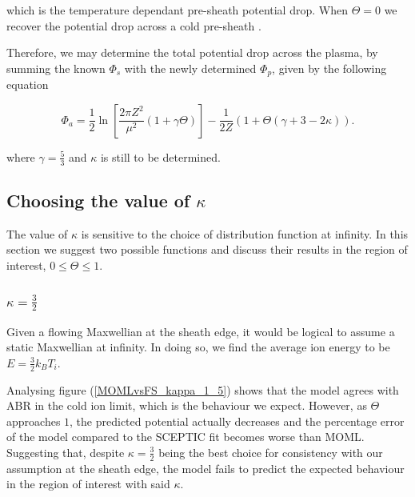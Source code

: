 \documentclass{article}
\begin{document}
\noindent which is the temperature dependant pre-sheath potential drop.
When $\Theta = 0$ we recover the potential drop across a cold pre-sheath \cite{Stangeby1986}.

\smallskip

Therefore, we may determine the total potential drop across the plasma, by summing the known
$\Phi_s$ with the newly determined $\Phi_p$, given by the following equation

\begin{equation}\label{eq:FSpotential}
\Phi_a =  \frac{1}{2}\ln{\left[\frac{2\pi Z^2}{\mu^2}(1 + \gamma \Theta)\right]} - \frac{1}{2Z}\left(1 + \Theta\left(\gamma + 3 -2\kappa\right)\right).
\end{equation}

\smallskip

\noindent where $\gamma = \frac{5}{3}$ and $\kappa$ is still to be determined.

\subsection{Choosing the value of $\kappa$}

\medskip

The value of $\kappa$ is sensitive to the choice of distribution function at infinity. In this
section we suggest two possible functions and discuss their results in the region of interest, 
$0 \leq \Theta \leq 1$.

\subsubsection{$\kappa = \frac{3}{2}$}

\medskip

Given a flowing Maxwellian at the sheath edge, it would be logical to assume a static Maxwellian at infinity.
In doing so, we find the average ion energy to be $E = \frac{3}{2}k_B T_i$.

\medskip

Analysing figure (\ref{MOMLvsFS_kappa_1_5}) shows that the model agrees with ABR in the cold ion limit, which is the behaviour we 
expect. However, as $\Theta$ approaches $1$, the predicted potential actually decreases and the percentage 
error of the model compared to the SCEPTIC fit becomes worse than MOML. Suggesting that, despite $\kappa = \frac{3}{2}$ being the best choice for consistency with our assumption
at the sheath edge, the model fails to predict the expected behaviour in the region of interest with said $\kappa$.
\end{document}

